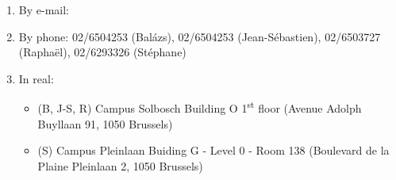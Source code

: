 \begin{enumerate}
\item  By e-mail:  \hpcinfo
\item  By phone: 02/6504253 (Bal\'azs), 02/6504253 (Jean-S\'ebastien), 02/6503727 (Rapha\"el), 02/6293326 (St\'ephane)
\item  In real:
\begin{itemize}
\item  (B, J-S, R) Campus Solbosch Building O 1\textsuperscript{st} floor (Avenue Adolph Buyllaan 91, 1050 Brussels)
\item  (S) Campus Pleinlaan Buiding G - Level 0 - Room 138 (Boulevard de la Plaine Pleinlaan 2, 1050 Brussels)
\end{itemize}
\end{enumerate}

